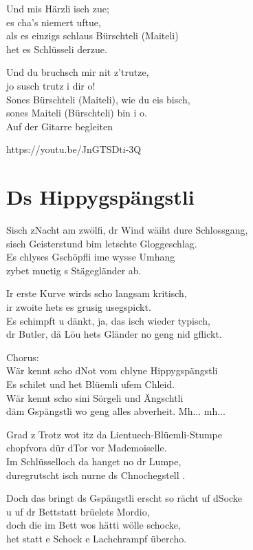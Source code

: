 \documentclass[
  letterpaper,
  twoside=false]{scrbook}
\begin{document}
Und mis Härzli isch zue;\\
es cha's niemert uftue,\\
als es einzigs schlaus Bürschteli (Maiteli)\\
het es Schlüsseli derzue.

Und du bruchsch mir nit z'trutze,\\
jo susch trutz i dir o!\\
Sones Bürschteli (Maiteli), wie du eis bisch,\\
sones Maiteli (Bürschteli) bin i o.\\
Auf der Gitarre begleiten

https://youtu.be/JnGTSDti-3Q

\hypertarget{ds-hippygspuxe4ngstli}{%
\chapter{Ds Hippygspängstli}\label{ds-hippygspuxe4ngstli}}

S\textquotesingle isch z\textquotesingle Nacht am zwölfi, dr Wind wäiht
dure Schlossgang,\\
s\textquotesingle isch Geisterstund bim letschte Gloggeschlag.\\
Es chlyses Gschöpfli ime wysse Umhang\\
zybet muetig s Stägegländer ab.

Ir erste Kurve wird\textquotesingle s scho langsam kritisch,\\
ir zwoite hets es grusig usegspickt.\\
Es schimpft u dänkt, ja, das isch wieder typisch,\\
dr Butler, dä Löu het\textquotesingle s Gländer no geng nid gflickt.

Chorus:\\
Wär kennt scho d\textquotesingle Not vom chlyne Hippygspängstli\\
Es schilet und het Blüemli ufem Chleid.\\
Wär kennt scho sini Sörgeli und Ängschtli\\
däm Gspängstli wo geng alles abverheit. Mh... mh...

Grad z Trotz wot itz da Lientuech-Blüemli-Stumpe\\
chopfvora dür d\textquotesingle Tor vor Mademoiselle.\\
Im Schlüsselloch da hanget no dr Lumpe,\\
duregrutscht isch nurne ds Chnochegstell .

Doch das bringt ds Gspängstli erscht so rächt uf
d\textquotesingle Socke\\
u uf dr Bettstatt brüelet\textquotesingle s Mordio,\\
doch die im Bett wo\textquotesingle s hätti wölle schocke,\\
het statt e Schock e Lachchrampf übercho.
\end{document}
